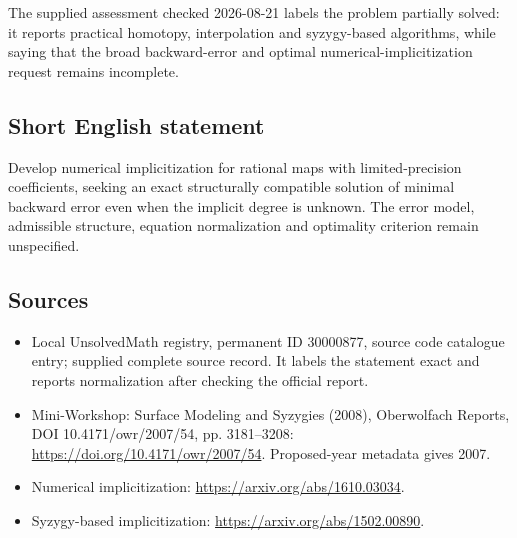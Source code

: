 \documentclass[11pt]{article}
\begin{document}
The supplied assessment checked 2026-08-21 labels the problem partially solved: it reports practical homotopy, interpolation and syzygy-based algorithms, while saying that the broad backward-error and optimal numerical-implicitization request remains incomplete.
\subsection{Short English statement}
Develop numerical implicitization for rational maps with limited-precision coefficients, seeking an exact structurally compatible solution of minimal backward error even when the implicit degree is unknown. The error model, admissible structure, equation normalization and optimality criterion remain unspecified.
\subsection{Sources}
\begin{itemize}
\item Local UnsolvedMath registry, permanent ID 30000877, source code catalogue entry; supplied complete source record. It labels the statement exact and reports normalization after checking the official report.
\item Mini-Workshop: Surface Modeling and Syzygies (2008), Oberwolfach Reports, DOI 10.4171/owr/2007/54, pp. 3181--3208: \url{https://doi.org/10.4171/owr/2007/54}. Proposed-year metadata gives 2007.
\item Numerical implicitization: \url{https://arxiv.org/abs/1610.03034}.
\item Syzygy-based implicitization: \url{https://arxiv.org/abs/1502.00890}.
\end{itemize}
\end{document}
